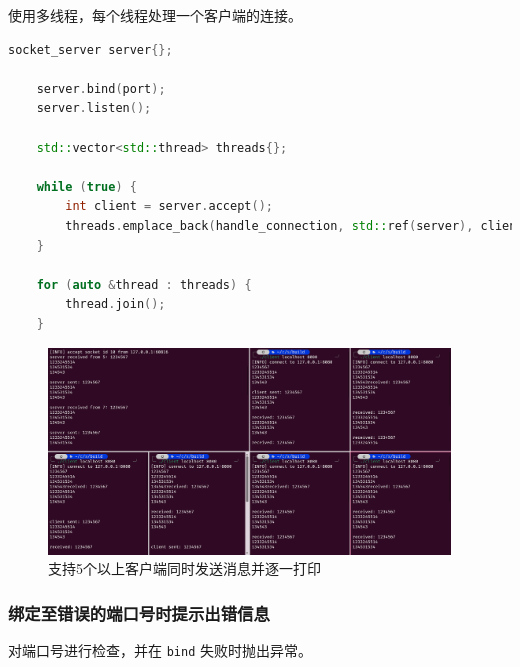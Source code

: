 \documentclass{article}
\begin{document}
使用多线程，每个线程处理一个客户端的连接。

\begin{lstlisting}[language=C++]
    socket_server server{};

    server.bind(port);
    server.listen();

    std::vector<std::thread> threads{};

    while (true) {
        int client = server.accept();
        threads.emplace_back(handle_connection, std::ref(server), client);
    }

    for (auto &thread : threads) {
        thread.join();
    }
\end{lstlisting}

\begin{figure}[H]
    \centering
    \includegraphics[width=0.95\textwidth]{img/2.png}
    \caption{支持5个以上客户端同时发送消息并逐一打印}
\end{figure}

\subsubsection{绑定至错误的端口号时提示出错信息}

对端口号进行检查，并在 \texttt{bind} 失败时抛出异常。
\end{document}
